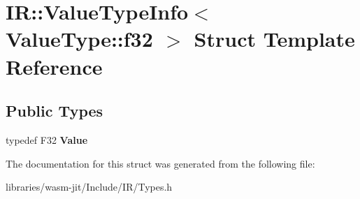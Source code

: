 \hypertarget{struct_i_r_1_1_value_type_info_3_01_value_type_1_1f32_01_4}{}\section{IR\+:\+:Value\+Type\+Info$<$ Value\+Type\+:\+:f32 $>$ Struct Template Reference}
\label{struct_i_r_1_1_value_type_info_3_01_value_type_1_1f32_01_4}
\subsection*{Public Types}
\begin{DoxyCompactItemize}
\item 
\mbox{\label{struct_i_r_1_1_value_type_info_3_01_value_type_1_1f32_01_4_aa17febcee7b3519de7a5dfa69de12f1e}} 
typedef F32 {\bfseries Value}
\end{DoxyCompactItemize}


The documentation for this struct was generated from the following file\+:\begin{DoxyCompactItemize}
\item 
libraries/wasm-\/jit/\+Include/\+I\+R/Types.\+h\end{DoxyCompactItemize}
